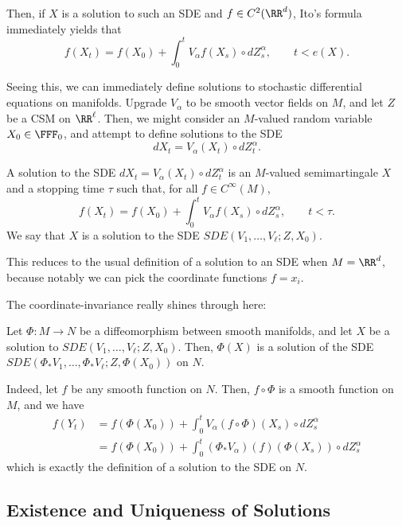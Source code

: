 \documentclass{scrartcl}
\begin{document}
Then, if $X$ is a solution to such an SDE and $f\in C^2(\RR^d)$, Ito's formula immediately yields that
\[
    f(X_t) = f(X_0) + \int_0^t V_\alpha f(X_s)\circ dZ^\alpha_s,\qquad t < e(X).    
\]

Seeing this, we can immediately define solutions to stochastic differential equations on manifolds. Upgrade $V_\alpha$ to be smooth vector fields on $M$, and let $Z$ be a CSM on $\RR^\ell$. Then, we might consider an $M$-valued random variable $X_0\in \FFF_0$, and attempt to define solutions to the SDE
\[
    dX_t = V_\alpha(X_t) \circ dZ^\alpha_t.
\]

\begin{defn}
    A solution to the SDE $dX_t = V_\alpha(X_t) \circ dZ^\alpha_t$ is an $M$-valued semimartingale $X$ and a stopping time $\tau$ such that, for all $f\in C^\infty(M)$,
    \[
        f(X_t) = f(X_0) + \int_0^t V_\alpha f(X_s)\circ dZ^\alpha_s,\qquad t < \tau.
    \]
    We say that $X$ is a solution to the SDE $SDE(V_1,\dots, V_\ell; Z, X_0)$.
\end{defn}

This reduces to the usual definition of a solution to an SDE when $M = \RR^d$, because notably we can pick the coordinate functions $f = x_i$.


The coordinate-invariance really shines through here:
\begin{claim*}
    Let $\Phi: M\to N$ be a diffeomorphism between smooth manifolds, and let $X$ be a solution to $SDE(V_1,\dots, V_\ell; Z, X_0)$. Then, $\Phi(X)$ is a solution of the SDE $SDE(\Phi_*V_1,\dots, \Phi_*V_\ell; Z, \Phi(X_0))$ on $N$.
\end{claim*}

Indeed, let $f$ be any smooth function on $N$. Then, $f\circ \Phi$ is a smooth function on $M$, and we have
\begin{align*}
    f(Y_t) &= f(\Phi(X_0)) + \int_0^t V_\alpha(f\circ \Phi)(X_s)\circ dZ^\alpha_s\\
    &= f(\Phi(X_0)) + \int_0^t (\Phi_*V_\alpha)(f)(\Phi(X_s))\circ dZ^\alpha_s
\end{align*}
which is exactly the definition of a solution to the SDE on $N$.

\subsection{Existence and Uniqueness of Solutions}
\end{document}
